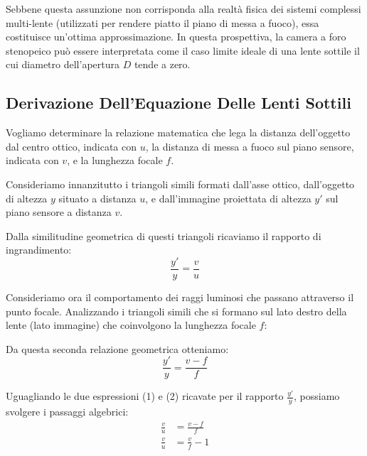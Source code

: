 ﻿\documentclass[11pt, a4paper]{article}
\begin{document}

Sebbene questa assunzione non corrisponda alla realtà fisica dei sistemi complessi multi-lente (utilizzati per rendere piatto il piano di messa a fuoco), essa costituisce un'ottima approssimazione. In questa prospettiva, la camera a foro stenopeico può essere interpretata come il caso limite ideale di una lente sottile il cui diametro dell'apertura $D$ tende a zero.

\newpage

\subsection{Derivazione Dell'Equazione Delle Lenti Sottili}

Vogliamo determinare la relazione matematica che lega la distanza dell'oggetto dal centro ottico, indicata con $u$, la distanza di messa a fuoco sul piano sensore, indicata con $v$, e la lunghezza focale $f$.

Consideriamo innanzitutto i triangoli simili formati dall'asse ottico, dall'oggetto di altezza $y$ situato a distanza $u$, e dall'immagine proiettata di altezza $y'$ sul piano sensore a distanza $v$.


Dalla similitudine geometrica di questi triangoli ricaviamo il rapporto di ingrandimento:
\begin{equation}
    \frac{y'}{y} = \frac{v}{u}
\end{equation}

Consideriamo ora il comportamento dei raggi luminosi che passano attraverso il punto focale. Analizzando i triangoli simili che si formano sul lato destro della lente (lato immagine) che coinvolgono la lunghezza focale $f$:


Da questa seconda relazione geometrica otteniamo:
\begin{equation}
    \frac{y'}{y} = \frac{v - f}{f}
\end{equation}

Uguagliando le due espressioni (1) e (2) ricavate per il rapporto $\frac{y'}{y}$, possiamo svolgere i passaggi algebrici:
\begin{align*}
    \frac{v}{u} &= \frac{v - f}{f} \\
    \frac{v}{u} &= \frac{v}{f} - 1
\end{align*}
\end{document}
